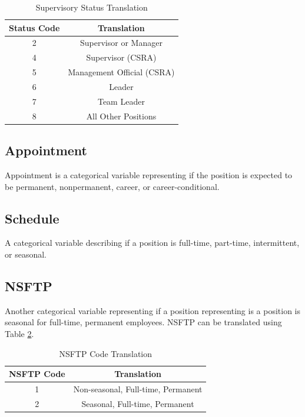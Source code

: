 \documentclass{article}
\begin{document}
        \begin{center}
            \begin{table}
                \centering
                \begin{tabular}{ |c|c| }
                    \hline
                    Status Code & Translation \\
                    \hline
                    2 & Supervisor or Manager \\
                    4 & Supervisor (CSRA) \\
                    5 & Management Official (CSRA) \\
                    6 & Leader \\
                    7 & Team Leader \\
                    8 & All Other Positions \\
                    \hline
                \end{tabular}
                \caption{Supervisory Status Translation}
                \label{tab:3}
            \end{table}
        \end{center}

    \subsection{Appointment}
    Appointment is a categorical variable representing if the position is expected to be permanent, nonpermanent, career, or career-conditional.

    \subsection{Schedule}
    A categorical variable describing if a position is full-time, part-time, intermittent, or seasonal.

    \subsection{NSFTP}
    Another categorical variable representing if a position representing is a position is seasonal for full-time, permanent employees. NSFTP can be translated using Table \ref{tab:4}.

        \begin{center}
            \begin{table}
                \centering
                \begin{tabular}{ |c|c| }
                    \hline
                    NSFTP Code & Translation \\
                    \hline
                    1 & Non-seasonal, Full-time, Permanent \\
                    2 & Seasonal, Full-time, Permanent \\
                    \hline
                \end{tabular}
                \caption{NSFTP Code Translation}
                \label{tab:4}
            \end{table}
        \end{center}
\end{document}
